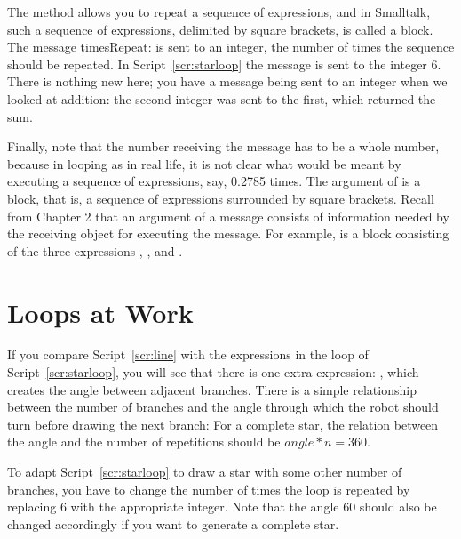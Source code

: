 \documentclass[a4paper,10pt,twoside]{book}
\begin{document}

The method  allows you to repeat a sequence of expressions, and in 
Smalltalk, such a sequence of expressions, delimited by square brackets, is called a block. 
The message timesRepeat: is sent to an integer, the number of times the sequence should 
be repeated. In Script~\ref{scr:starloop} the message  is sent to the integer 6. There is nothing new here; you have a message being sent to an integer when we looked at addition: the second integer was sent to the first, which returned the sum. 

Finally, note that the number receiving the message  has to be a whole 
number, because in looping as in real life, it is not clear what would be meant by executing a 
sequence of expressions, say, 0.2785 times. 
The argument of  is a block, that is, a sequence of expressions surrounded 
by square brackets. Recall from Chapter 2 that an argument of a message consists of information needed by the receiving object for executing the message. For example,  is a block consisting of the three expressions , , and .





\section{Loops at Work}
If you compare Script~\ref{scr:line} with the expressions in the loop of 
Script~\ref{scr:starloop}, you will see that there is one extra expression: , which creates the angle between adjacent branches. There is a simple relationship between the number of branches and the angle through which the robot should turn before drawing the next branch: For a complete star, the relation between the angle and the number of repetitions should be $angle*n= 360$. 

To adapt Script~\ref{scr:starloop} to draw a star with some other number of branches, you have to change the number of times the loop is repeated by replacing 6 with the appropriate integer. Note that the angle 60 should also be changed accordingly if you want to generate a complete star. 
\end{document}
